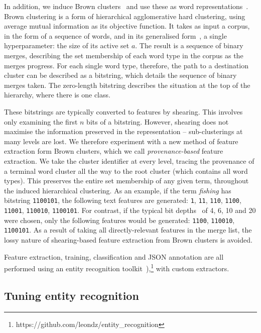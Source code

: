 \documentclass[journal,10pt,draftclsnofoot,onecolumn]{IEEEtran}
\begin{document}
In addition, we induce Brown clusters~\cite{brown1992class} and use these as word representations~\cite{turian2009preliminary}.
Brown clustering is a form of hierarchical agglomerative hard clustering, using average mutual information as its objective function.
It takes as input a corpus, in the form of a sequence of words, and in its generalised form~\cite{derczynski2016generalised}, a single hyperparameter: the size of its active set $a$.
The result is a sequence of binary merges, describing the set membership of each word type in the corpus as the merges progress.
For each single word type, therefore, the path to a destination cluster can be described as a bitstring, which details the sequence of binary merges taken.
The zero-length bitstring describes the situation at the top of the hierarchy, where there is one class.

These bitstrings are typically converted to features by shearing.
This involves only examining the first $n$ bits of a bitstring.
However, shearing does not maximise the information preserved in the representation -- sub-clusterings at many levels are lost.
We therefore experiment with a new method of feature extraction form Brown clusters, which we call {\em provenance-based} feature extraction.
We take the cluster identifier at every level, tracing the provenance of a terminal word cluster all the way to the root cluster (which contains all word types).
This preserves the entire set membership of any given term, throughout the induced hierarchical clustering.
As an example, if the term \emph{fishing} has bitstring {\tt 1100101}, the following text features are generated: {\tt 1}, {\tt 11}, {\tt 110}, {\tt 1100}, {\tt 11001}, {\tt 110010}, {\tt 1100101}.
For contrast, if the typical bit depths~\cite{ratinov2009design} of 4, 6, 10 and 20 were chosen, only the following features would be generated: {\tt 1100}, {\tt 110010}, {\tt 1100101}.
As a result of taking all directly-relevant features in the merge list, the lossy nature of shearing-based feature extraction from Brown clusters is avoided.

Feature extraction, training, classification and JSON annotation are all performed using an entity recognition toolkit~\cite{derczynski2015usfd}),\footnote{https://github.com/leondz/entity\_recognition} with custom extractors.


\subsection{Tuning entity recognition}
\end{document}
